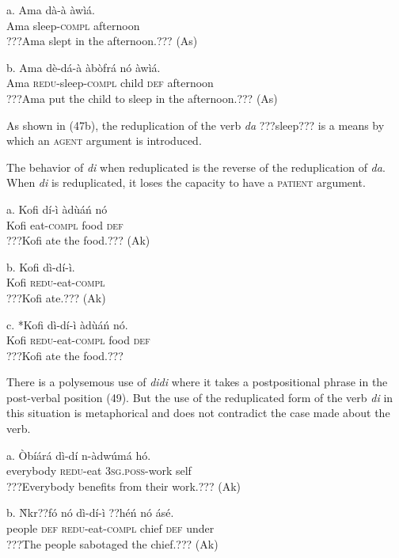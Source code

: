 \documentclass[output=paper]{langsci/langscibook}
\begin{document}
\ea
\gll a.  Ama  dà-à    àwìá.\\
       Ama  sleep-\textsc{compl}  afternoon\\
\glt   ???Ama slept in the afternoon.??? (As)
\z

\ea
\gll  b.  Ama  dè-dá-à    àbòfrá    nó  àwìá.\\
       Ama  \textsc{redu}{}-sleep\textsc{{}-compl}  child    \textsc{def}  afternoon\\
\glt   ???Ama put the child to sleep in the afternoon.??? (As)
\z

As shown in (47b), the reduplication of the verb \emph{da} ???sleep??? is a means by which an \textsc{agent} argument is introduced.

The behavior of \emph{di} when reduplicated is the reverse of the reduplication of \emph{da}. When \emph{di} is reduplicated, it loses the capacity to have a \textsc{patient} argument.

\ea
\gll a.  Kofi  dí-ì    àd\`{u}áń    nó\\
       Kofi  eat-\textsc{compl}  food    \textsc{def}\\
\glt   ???Kofi ate the food.??? (Ak)
\z

\ea
\gll  b.  Kofi  dì-dí-ì.\\
       Kofi  \textsc{redu}{}-eat-\textsc{compl}\\
\glt   ???Kofi ate.??? (Ak)
\z

\ea
\gll  c.  *Kofi  dì-dí-ì      àd\`{u}áń    nó.\\
       Kofi  \textsc{redu}{}-eat-\textsc{compl}  food    \textsc{def}\\
\glt   ???Kofi ate the food.???
\z

There is a polysemous use of \emph{didi} where it takes a postpositional phrase in the post-verbal position (49). But the use of the reduplicated form of the verb \emph{di} in this situation is metaphorical and does not contradict the case made about the verb.

\ea
\gll a.  \`{O}bíárá    dì-dí    n-àdwúmá    hó.\\
       everybody  \textsc{redu}{}-eat  \textsc{3sg.poss}{}-work  self\\
\glt   ???Everybody benefits from their work.??? (Ak)
\z

\ea
\gll  b.  \`{N}kr??fó  nó  dì-dí-ì      ??héń   nó  ásé.\\
       people  \textsc{def}  \textsc{redu}{}-eat-\textsc{compl}  chief  \textsc{def}  under\\
\glt   ???The people sabotaged the chief.??? (Ak)
\z
\end{document}
